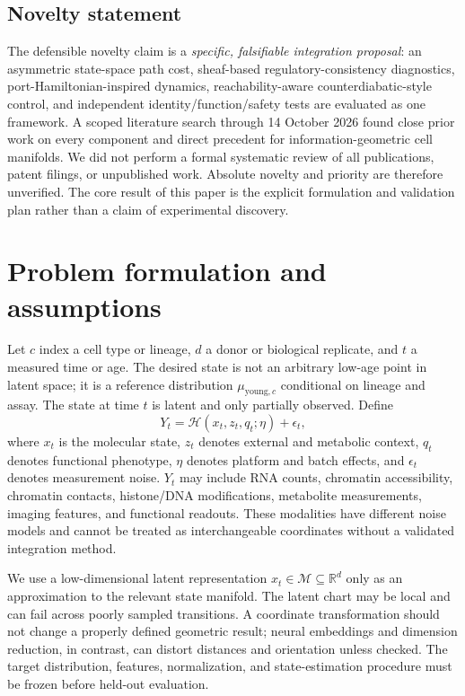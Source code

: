 \documentclass[11pt,a4paper]{article}
\theoremstyle{definition}
\theoremstyle{remark}
\newcommand{\R}{\mathbb{R}}
\newcommand{\M}{\mathcal{M}}
\begin{document}
\subsection{Novelty statement}
The defensible novelty claim is a \emph{specific, falsifiable integration proposal}: an asymmetric state-space path cost, sheaf-based regulatory-consistency diagnostics, port-Hamiltonian-inspired dynamics, reachability-aware counterdiabatic-style control, and independent identity/function/safety tests are evaluated as one framework. A scoped literature search through 14 October 2026 found close prior work on every component and direct precedent for information-geometric cell manifolds. We did not perform a formal systematic review of all publications, patent filings, or unpublished work. Absolute novelty and priority are therefore unverified. The core result of this paper is the explicit formulation and validation plan rather than a claim of experimental discovery.

\section{Problem formulation and assumptions}
Let $c$ index a cell type or lineage, $d$ a donor or biological replicate, and $t$ a measured time or age. The desired state is not an arbitrary low-age point in latent space; it is a reference distribution $\mu_{\mathrm{young},c}$ conditional on lineage and assay. The state at time $t$ is latent and only partially observed. Define
\begin{equation}
Y_t = \mathcal{H}(x_t, z_t, q_t; \eta) + \epsilon_t,
\label{eq:observation}
\end{equation}
where $x_t$ is the molecular state, $z_t$ denotes external and metabolic context, $q_t$ denotes functional phenotype, $\eta$ denotes platform and batch effects, and $\epsilon_t$ denotes measurement noise. $Y_t$ may include RNA counts, chromatin accessibility, chromatin contacts, histone/DNA modifications, metabolite measurements, imaging features, and functional readouts. These modalities have different noise models and cannot be treated as interchangeable coordinates without a validated integration method.

We use a low-dimensional latent representation $x_t\in\M\subseteq\R^d$ only as an approximation to the relevant state manifold. The latent chart may be local and can fail across poorly sampled transitions. A coordinate transformation should not change a properly defined geometric result; neural embeddings and dimension reduction, in contrast, can distort distances and orientation unless checked. The target distribution, features, normalization, and state-estimation procedure must be frozen before held-out evaluation.
\end{document}
